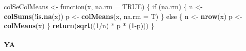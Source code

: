 \documentclass[11pt,,]{article}
\newenvironment{Shaded}{\begin{snugshade}}{\end{snugshade}}
\newcommand{\KeywordTok}[1]{\textcolor[rgb]{0.13,0.29,0.53}{\textbf{{#1}}}}
\newcommand{\DataTypeTok}[1]{\textcolor[rgb]{0.13,0.29,0.53}{{#1}}}
\newcommand{\DecValTok}[1]{\textcolor[rgb]{0.00,0.00,0.81}{{#1}}}
\newcommand{\StringTok}[1]{\textcolor[rgb]{0.31,0.60,0.02}{{#1}}}
\newcommand{\OtherTok}[1]{\textcolor[rgb]{0.56,0.35,0.01}{{#1}}}
\newcommand{\NormalTok}[1]{{#1}}
\let\oldparagraph\paragraph
\renewcommand{\paragraph}[1]{\oldparagraph{#1}\mbox{}}
\begin{document}
\newpage

\begin{Shaded}
\end{Shaded}

\newpage

\begin{Shaded}
\begin{Highlighting}[]
\NormalTok{colSeColMeans <-}\StringTok{ }\NormalTok{function(x, }\DataTypeTok{na.rm =} \OtherTok{TRUE}\NormalTok{) \{}
    \NormalTok{if (na.rm) \{ }
        \NormalTok{n <-}\StringTok{ }\KeywordTok{colSums}\NormalTok{(!}\KeywordTok{is.na}\NormalTok{(x)) }
        \NormalTok{p <-}\StringTok{ }\KeywordTok{colMeans}\NormalTok{(x, }\DataTypeTok{na.rm =} \NormalTok{T)}
    \NormalTok{\} }
    \NormalTok{else \{}
        \NormalTok{n <-}\StringTok{ }\KeywordTok{nrow}\NormalTok{(x) }
        \NormalTok{p <-}\StringTok{ }\KeywordTok{colMeans}\NormalTok{(x)}
    \NormalTok{\}}
    \KeywordTok{return}\NormalTok{(}\KeywordTok{sqrt}\NormalTok{((}\DecValTok{1}\NormalTok{/n) *}\StringTok{ }\NormalTok{p *}\StringTok{ }\NormalTok{(}\DecValTok{1}\NormalTok{-p)))}
\NormalTok{\}}
\end{Highlighting}
\end{Shaded}

\paragraph{YA}\label{ya}
\end{document}
